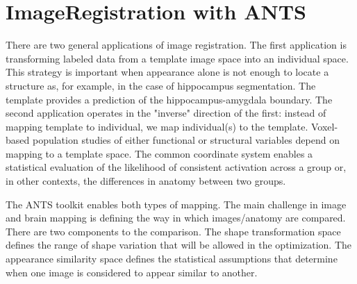 \documentclass{InsightArticle}
\begin{document}
\section{ImageRegistration with ANTS}
\begin{figure}
\end{figure}
There are two general applications of image registration. The first application is transforming labeled data from a template image space into an individual space. This strategy is important when appearance alone is not enough to locate a structure as, for example, in the case of hippocampus segmentation. The template provides a prediction of the hippocampus-amygdala boundary.
The second application operates in the "inverse" direction of the first: instead of mapping template to individual, we map individual(s) to the template. Voxel-based population studies of either functional or structural variables depend on mapping to a template space. The common coordinate system enables a statistical evaluation of the likelihood of consistent activation across a group or, in other contexts, the differences in anatomy between two groups. 

The ANTS toolkit enables both types of mapping. The main challenge in image and brain mapping is defining the way in which images/anatomy are compared. There are two components to the comparison.
The shape transformation space defines the range of shape variation that will be allowed in the optimization.
The appearance similarity space defines the statistical assumptions that determine when one image is considered to appear similar to another. 
\end{document}
